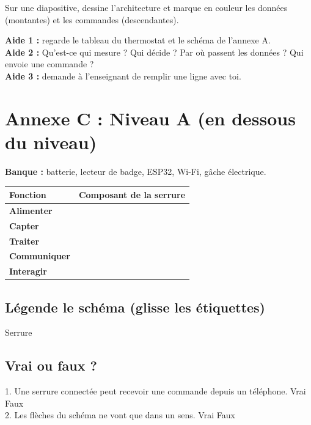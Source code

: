 \documentclass[11pt,a4paper]{article}
\begin{document}
Sur une diapositive, dessine l'architecture et marque en couleur les données (montantes) et les commandes (descendantes).

\begin{tcolorbox}[colback=yellow!10,colframe=yellow!50!black,title={Cartes d'aide à utiliser dans l'ordre},fonttitle=\bfseries\small]
\textbf{Aide 1 :} regarde le tableau du thermostat et le schéma de l'annexe A.\\
\textbf{Aide 2 :} Qu'est-ce qui mesure ? Qui décide ? Par où passent les données ? Qui envoie une commande ?\\
\textbf{Aide 3 :} demande à l'enseignant de remplir une ligne avec toi.
\end{tcolorbox}

\newpage
\section*{Annexe C : Niveau A (en dessous du niveau)}

\textbf{Banque :} batterie, lecteur de badge, ESP32, Wi-Fi, gâche électrique.

\begin{tabularx}{\linewidth}{>{\bfseries}p{3cm}Y}
\toprule
Fonction & Composant de la serrure\\
\midrule
Alimenter & \\ Capter & \\ Traiter & \\ Communiquer & \\ Interagir & \\
\bottomrule
\end{tabularx}

\subsection*{Légende le schéma (glisse les étiquettes)}
Serrure \fl{} \dotfill{} \fl{} \dotfill{} \fl{} \dotfill

\subsection*{Vrai ou faux ?}
1. Une serrure connectée peut recevoir une commande depuis un téléphone. \cb Vrai \cb Faux\\
2. Les flèches du schéma ne vont que dans un sens. \cb Vrai \cb Faux

\newpage
\end{document}
